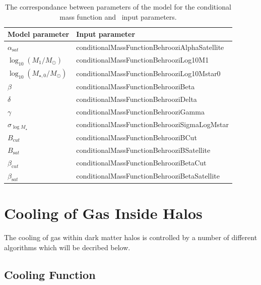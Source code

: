 \begin{table}
 \caption{The correspondance between parameters of the \protect\cite{behroozi_comprehensive_2010} model for the conditional mass function and \protect\glc\ input parameters.}
 \label{tb:Behroozi2010ConditionalMassFunctionParameters}
 \begin{center}
 \begin{tabular}{ll}
  \hline
  {\normalfont \bfseries Model parameter} & {\normalfont \bfseries Input parameter} \\
  \hline
$\alpha_{\mathrm sat}$ & {\normalfont \ttfamily conditionalMassFunctionBehrooziAlphaSatellite} \\
$\log_{10}(M_1/M_\odot)$ & {\normalfont \ttfamily conditionalMassFunctionBehrooziLog10M1} \\
$\log_{10}(M_{\star,0}/M_\odot)$ & {\normalfont \ttfamily conditionalMassFunctionBehrooziLog10Mstar0} \\
$\beta$ & {\normalfont \ttfamily conditionalMassFunctionBehrooziBeta} \\
$\delta$ & {\normalfont \ttfamily conditionalMassFunctionBehrooziDelta} \\
$\gamma$ & {\normalfont \ttfamily conditionalMassFunctionBehrooziGamma} \\
$\sigma_{\log M_\star}$ & {\normalfont \ttfamily conditionalMassFunctionBehrooziSigmaLogMstar} \\
$B_{\mathrm cut}$ & {\normalfont \ttfamily conditionalMassFunctionBehrooziBCut} \\
$B_{\mathrm sat}$ & {\normalfont \ttfamily conditionalMassFunctionBehrooziBSatellite} \\
$\beta_{\mathrm cut}$ & {\normalfont \ttfamily conditionalMassFunctionBehrooziBetaCut} \\
$\beta_{\mathrm sat}$ & {\normalfont \ttfamily conditionalMassFunctionBehrooziBetaSatellite} \\
  \hline
 \end{tabular}
 \end{center}
\end{table}

\section{Cooling of Gas Inside Halos}

The cooling of gas within dark matter halos is controlled by a number of different algorithms which will be decribed below.

\subsection{Cooling Function}

